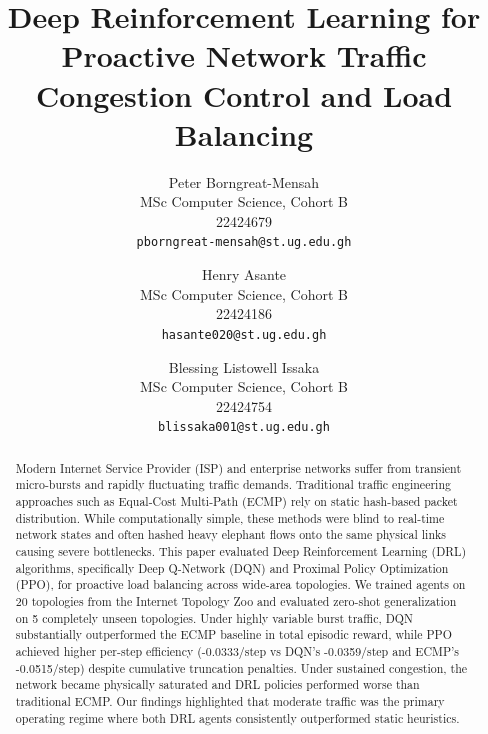 \documentclass[10pt,twocolumn,letterpaper]{article}
\begin{document}
\title{Deep Reinforcement Learning for Proactive Network Traffic Congestion Control and Load Balancing}

\author{
\small Peter Borngreat-Mensah\\
\small MSc Computer Science, Cohort B\\
\small 22424679\\
\small {\tt\scriptsize pborngreat-mensah@st.ug.edu.gh}
\and
\small Henry Asante\\
\small MSc Computer Science, Cohort B\\
\small 22424186\\
\small {\tt\scriptsize hasante020@st.ug.edu.gh}
\and
\small Blessing Listowell Issaka\\
\small MSc Computer Science, Cohort B\\
\small 22424754\\
\small {\tt\scriptsize blissaka001@st.ug.edu.gh}
}

\maketitle

\begin{abstract}
Modern Internet Service Provider (ISP) and enterprise networks suffer from transient micro-bursts and rapidly fluctuating traffic demands. Traditional traffic engineering approaches such as Equal-Cost Multi-Path (ECMP) rely on static hash-based packet distribution. While computationally simple, these methods were blind to real-time network states and often hashed heavy elephant flows onto the same physical links causing severe bottlenecks. This paper evaluated Deep Reinforcement Learning (DRL) algorithms, specifically Deep Q-Network (DQN) and Proximal Policy Optimization (PPO), for proactive load balancing across wide-area topologies. We trained agents on 20 topologies from the Internet Topology Zoo and evaluated zero-shot generalization on 5 completely unseen topologies. Under highly variable burst traffic, DQN substantially outperformed the ECMP baseline in total episodic reward, while PPO achieved higher per-step efficiency (-0.0333/step vs DQN's -0.0359/step and ECMP's -0.0515/step) despite cumulative truncation penalties. Under sustained congestion, the network became physically saturated and DRL policies performed worse than traditional ECMP. Our findings highlighted that moderate traffic was the primary operating regime where both DRL agents consistently outperformed static heuristics.
\end{abstract}
\end{document}
